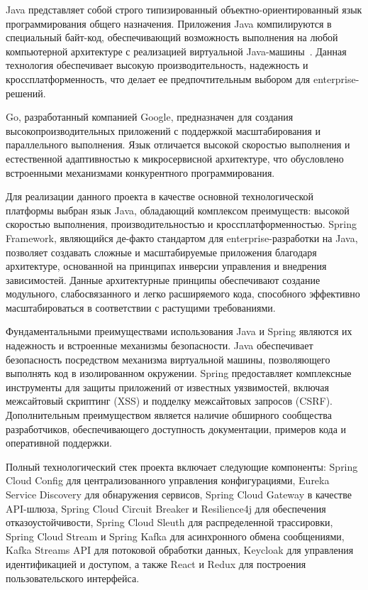 Java представляет собой строго типизированный объектно-ориентированный язык программирования общего назначения.
Приложения Java компилируются в специальный байт-код, обеспечивающий возможность выполнения на любой компьютерной архитектуре с реализацией виртуальной Java-машины~\cite{12_schildt2019}. Данная технология обеспечивает высокую производительность, надежность и кроссплатформенность, что делает ее предпочтительным выбором для enterprise-решений.

Go, разработанный компанией Google, предназначен для создания высокопроизводительных приложений с поддержкой масштабирования и параллельного выполнения. Язык отличается высокой скоростью выполнения и естественной адаптивностью к микросервисной архитектуре, что обусловлено встроенными механизмами конкурентного программирования.

Для реализации данного проекта в качестве основной технологической платформы выбран язык Java, обладающий комплексом преимуществ: высокой скоростью выполнения, производительностью и кроссплатформенностью.
Spring Framework, являющийся де-факто стандартом для enterprise-разработки на Java, позволяет создавать сложные и масштабируемые приложения благодаря архитектуре, основанной на принципах инверсии управления и внедрения зависимостей. Данные архитектурные принципы обеспечивают создание модульного, слабосвязанного и легко расширяемого кода, способного эффективно масштабироваться в соответствии с растущими требованиями.

Фундаментальными преимуществами использования Java и Spring являются их надежность и встроенные механизмы безопасности.
Java обеспечивает безопасность посредством механизма виртуальной машины, позволяющего выполнять код в изолированном окружении.
Spring предоставляет комплексные инструменты для защиты приложений от известных уязвимостей, включая межсайтовый скриптинг (XSS) и подделку межсайтовых запросов (CSRF). Дополнительным преимуществом является наличие обширного сообщества разработчиков, обеспечивающего доступность документации, примеров кода и оперативной поддержки.

Полный технологический стек проекта включает следующие компоненты: Spring Cloud Config для централизованного управления конфигурациями, Eureka Service Discovery для обнаружения сервисов, Spring Cloud Gateway в качестве API-шлюза, Spring Cloud Circuit Breaker и Resilience4j для обеспечения отказоустойчивости, Spring Cloud Sleuth для распределенной трассировки, Spring Cloud Stream и Spring Kafka для асинхронного обмена сообщениями, Kafka Streams API для потоковой обработки данных, Keycloak для управления идентификацией и доступом, а также React и Redux для построения пользовательского интерфейса.

